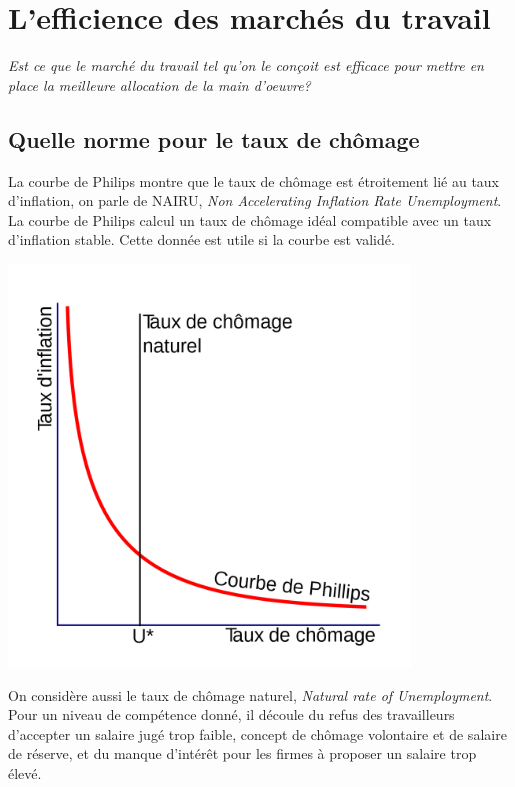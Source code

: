 \documentclass[main.tex]{subfiles}
\begin{document}
        \chapter{L'efficience des marchés du travail} 
        \emph{Est ce que le marché du travail tel qu'on le conçoit est efficace pour mettre en place la meilleure allocation de la main d'oeuvre?}

        \section{Quelle norme pour le taux de chômage}

        \begin{minipage}{0.5\textwidth}
                La courbe de Philips montre que le taux de chômage est étroitement lié au taux d'inflation, on parle de NAIRU, \emph{Non Accelerating Inflation Rate Unemployment}. La courbe de Philips calcul un taux de chômage idéal compatible avec un taux d'inflation stable. Cette donnée est utile si la courbe est validé.         \end{minipage}
        \hfill
        \begin{minipage}{0.5\textwidth}
                \center
                \includegraphics[width=0.8\textwidth]{nairu.png}
        \end{minipage}
        \medskip

On considère aussi le taux de chômage naturel, \emph{Natural rate of Unemployment}. Pour un niveau de compétence donné, il découle du refus des travailleurs d'accepter un salaire jugé trop faible, concept de chômage volontaire et de salaire de réserve, et du manque d'intérêt pour les firmes à proposer un salaire trop élevé. \\
\end{document}
